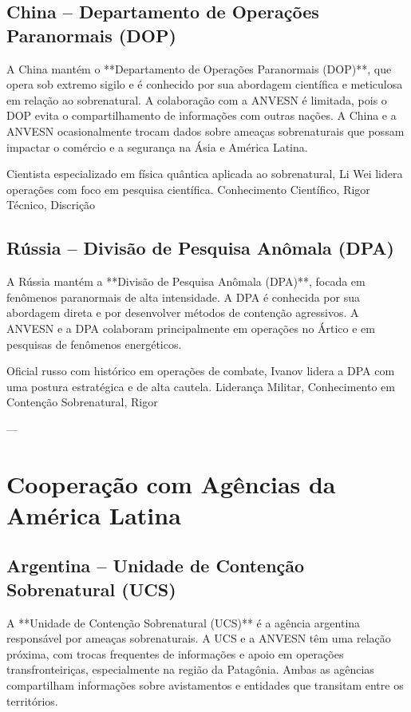 \subsection{China – Departamento de Operações Paranormais (DOP)}
A China mantém o **Departamento de Operações Paranormais (DOP)**, que opera sob extremo sigilo e é conhecido por sua abordagem científica e meticulosa em relação ao sobrenatural. A colaboração com a ANVESN é limitada, pois o DOP evita o compartilhamento de informações com outras nações. A China e a ANVESN ocasionalmente trocam dados sobre ameaças sobrenaturais que possam impactar o comércio e a segurança na Ásia e América Latina.

{Cientista especializado em física quântica aplicada ao sobrenatural, Li Wei lidera operações com foco em pesquisa científica.}
{Conhecimento Científico, Rigor Técnico, Discrição}

\subsection{Rússia – Divisão de Pesquisa Anômala (DPA)}
A Rússia mantém a **Divisão de Pesquisa Anômala (DPA)**, focada em fenômenos paranormais de alta intensidade. A DPA é conhecida por sua abordagem direta e por desenvolver métodos de contenção agressivos. A ANVESN e a DPA colaboram principalmente em operações no Ártico e em pesquisas de fenômenos energéticos.

{Oficial russo com histórico em operações de combate, Ivanov lidera a DPA com uma postura estratégica e de alta cautela.}
{Liderança Militar, Conhecimento em Contenção Sobrenatural, Rigor}

---

\section{Cooperação com Agências da América Latina}

\subsection{Argentina – Unidade de Contenção Sobrenatural (UCS)}
A **Unidade de Contenção Sobrenatural (UCS)** é a agência argentina responsável por ameaças sobrenaturais. A UCS e a ANVESN têm uma relação próxima, com trocas frequentes de informações e apoio em operações transfronteiriças, especialmente na região da Patagônia. Ambas as agências compartilham informações sobre avistamentos e entidades que transitam entre os territórios.

